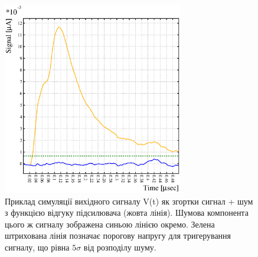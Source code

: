 \documentclass[pdftex,14pt]{scrartcl}
\begin{document}
\begin{spacing}{1.5}
	

	\begin{figure}[h!]
	\centering
	\includegraphics[width=0.7\textwidth]{signal_noise_threshold.eps}
	\caption{Приклад симуляції вихідного сигналу V(t) як згортки сигнал + шум з функцією відгуку підсилювача (жовта лінія). Шумова компонента цього ж сигналу зображена синьою лінією окремо. Зелена штрихована лінія позначає порогову напругу для тригерування сигналу, що рівна $5\sigma$ від розподілу шуму. }
	\label{fig:signal_example}
	\end{figure}
	

\end{spacing}
\end{document}
